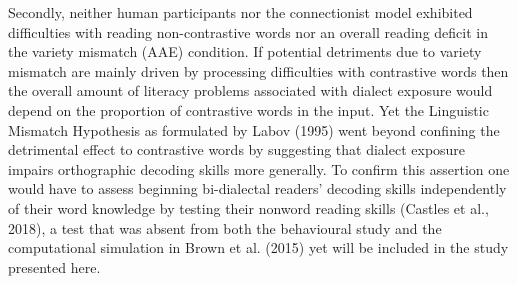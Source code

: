 \documentclass[doc,floatsintext]{apa6}
\begin{document}
Secondly, neither human participants nor the connectionist model
exhibited difficulties with reading non-contrastive words nor an overall
reading deficit in the variety mismatch (AAE) condition. If potential
detriments due to variety mismatch are mainly driven by processing
difficulties with contrastive words then the overall amount of literacy
problems associated with dialect exposure would depend on the proportion
of contrastive words in the input. Yet the Linguistic Mismatch
Hypothesis as formulated by Labov (1995) went beyond confining the
detrimental effect to contrastive words by suggesting that dialect
exposure impairs orthographic decoding skills more generally. To confirm
this assertion one would have to assess beginning bi-dialectal readers'
decoding skills independently of their word knowledge by testing their
nonword reading skills (Castles et al., 2018), a test that was absent
from both the behavioural study and the computational simulation in
Brown et al. (2015) yet will be included in the study presented here.
\end{document}
